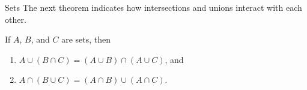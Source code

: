 \begin{section}{Sets}
The next theorem indicates how intersections and unions interact with each other.

\begin{theorem}
If $A$, $B$, and $C$ are sets, then
\begin{enumerate}[label=\textrm{(\alph*)}]
\item $A \cup(B\cap C) = (A\cup B)\cap (A\cup C)$, and
\item $A\cap (B\cup C)= (A\cap B)\cup (A\cap C)$.
\end{enumerate}
\end{theorem}

\end{section}
